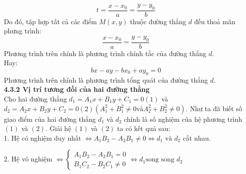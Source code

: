 \documentclass[12pt,a4]{article}
\begin{document}
\begin{titlepage}
    \[
    t = \frac{x - x_0}{a} = \frac{y - y_0}{b}
    \]
    Do đó, tập hợp tất cả các điểm $M(x,y)$ thuộc đường thẳng $d$ đều thoả mãn phưng trình:
    \[
    \frac{x - x_0}{a} = \frac{y - y_0}{b}
    \]
    Phương trình trên chính là phương trình chính tắc của đường thẳng $d$.\\
    Hay:
    \[
    bx - ay - bx_0 + ay_0 = 0
    \]
    Phương trình trên chính là phương trình tổng quát của đường thẳng $d$.\\
    \textbf{4.3.2 Vị trí tương đối của hai đường thẳng}\\
    Cho hai đường thẳng $d_1 = A_1x + B_1y + C_1 = 0 (1)$ và $d_2 = A_2x + B_2y + C_2 = 0 (2) (A_1^2 + B_1^2 \neq 0 \text{và} A_2^2 + B_2^2 \neq 0)$. Như ta đã biết số giao điểm của hai đường thẳng $d_1$ và $d_2$ chính là số nghiệm của hệ phương trình $(1)$ và $(2)$. Giải hệ $(1)$ và $(2)$ ta có kết quả sau:\\
    1. Hệ có nghiệm duy nhất $\Leftrightarrow A_1B_2 - A_2B_1 \neq 0 \Leftrightarrow d_1 \text{ và } d_2$ cắt nhau.\\
    \begin{center}
    \end{center}
    2. Hệ vô nghiệm $\Leftrightarrow \begin{cases} A_1B_2 - A_2B_1 = 0\\ B_1C_2 -B_2C_1 \neq 0\end{cases} \Leftrightarrow d_1 \text{song song } d_2$\\
    \begin{center}
\end{center}
\end{titlepage}
\end{document}

